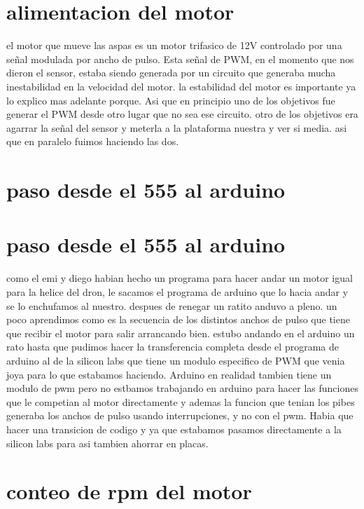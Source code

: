 \documentclass[a4paper]{article}
\begin{document}
\section{alimentacion del motor} %
\label{sec:alimentacion_del_motor}
el motor que mueve las aspas es un motor trifasico de 12V controlado por una señal modulada por ancho de pulso. Esta señal de PWM, en el momento que nos dieron el sensor, estaba siendo generada por un circuito que generaba mucha inestabilidad en la velocidad del motor. la estabilidad del motor es importante ya lo explico mas adelante porque. Asi que en principio uno de los objetivos fue generar el PWM desde otro lugar que no sea ese circuito. otro de los objetivos era agarrar la señal del sensor y meterla a la plataforma nuestra y ver si media. asi que en paralelo fuimos haciendo las dos.


\section*{paso desde el 555 al arduino}
\section{paso desde el 555 al arduino} %
\label{sec:paso_desde_el_555_al_arduino}

como el emi y diego habian hecho un programa para hacer andar un motor igual para la helice del dron, le sacamos el programa de arduino que lo hacia andar y se lo enchufamos al nuestro. despues de renegar un ratito anduvo a pleno. un poco aprendimos como es la secuencia de los distintos anchos de pulso que tiene que recibir el motor para salir arrancando bien. estubo andando en el arduino un rato hasta que pudimos hacer la transferencia completa desde el programa de arduino al de la silicon labs que tiene un modulo especifico de PWM que venia joya para lo que estabamos haciendo. Arduino en realidad tambien tiene un modulo de pwm pero no estbamos trabajando en arduino para hacer las funciones que le competian al motor directamente y ademas la funcion que tenian los pibes generaba los anchos de pulso usando interrupciones, y no con el pwm. Habia que hacer una transicion de codigo y ya que estabamos pasamos directamente a la silicon labs para asi tambien ahorrar en placas.

\section*{conteo de rpm del motor}
\end{document}
